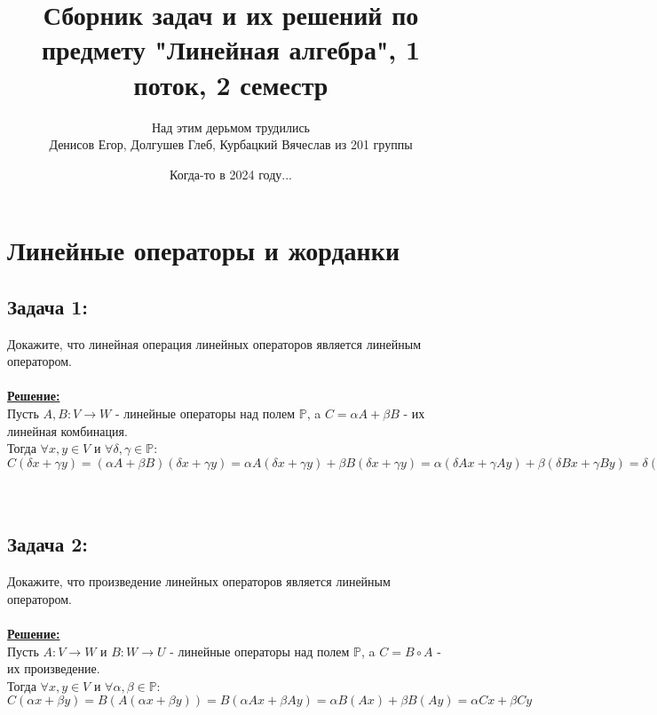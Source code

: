 \documentclass[a4paper,12pt,titlepage,final]{article}
\title{Сборник задач и их решений по предмету "Линейная алгебра", 1 поток, 2 семестр}
\author{ Над этим дерьмом трудились\\Денисов Егор, Долгушев Глеб, Курбацкий Вячеслав из 201 группы}
\date{Когда-то в 2024 году...}
\begin{document}
\maketitle

\newpage
\tableofcontents

\newpage
\section*{Линейные операторы и жорданки}

\subsection*{Задача 1:}
\noindent Докажите, что линейная операция линейных операторов является линейным оператором. \\ \\
\textbf{\underline{Решение:}} \\
Пусть $A, B: V \rightarrow W$ - линейные операторы над полем $\mathbb{P}$, a $C = \alpha A + \beta B$ - их линейная комбинация.\\
Тогда $\forall x, y \in V$ и $\forall \delta, \gamma \in \mathbb{P}$:
$C(\delta x + \gamma y) = (\alpha A + \beta B) (\delta x + \gamma y) = \alpha A(\delta x + \gamma y) + \beta B(\delta x + \gamma y) =
\alpha (\delta Ax + \gamma Ay) + \beta (\delta Bx + \gamma By) = \delta (\alpha Ax + \beta Bx) + \gamma (\alpha Ay + \beta By) =
\delta (\alpha A + \beta B)x + \gamma (\alpha A + \beta B)y = \delta Cx + \gamma Cy$ \\ \\ \\

\subsection*{Задача 2:}
\noindent Докажите, что произведение линейных операторов является линейным оператором. \\ \\
\textbf{\underline{Решение:}} \\
Пусть $A: V \rightarrow W$ и $B: W \rightarrow U$ - линейные операторы над полем $\mathbb{P}$, a $C = B \circ A$ - их произведение.\\
Тогда $\forall x, y \in V$ и $\forall \alpha, \beta \in \mathbb{P}$:
$C(\alpha x + \beta y) = B(A(\alpha x + \beta y)) = B(\alpha Ax + \beta Ay) = \alpha B(Ax) + \beta B(Ay) = \alpha Cx + \beta Cy$ \\ \\ \\
\end{document}

